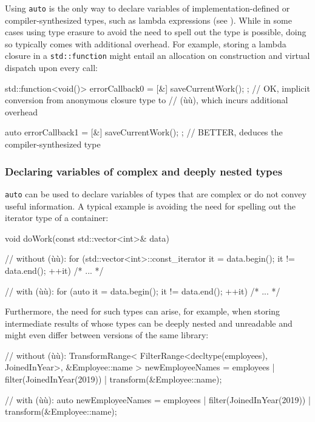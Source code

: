 Using \lstinline!auto! is the only way to declare variables of
implementation-defined or compiler-synthesized types, such as
lambda expressions (see ). While in some cases 
using type erasure to avoid the need to spell out the type is possible, doing so typically
comes with additional overhead. For example, storing a lambda closure in
a \lstinline!std::function! might entail an allocation on construction and
virtual dispatch upon every call:

\begin{emcppslisting}[language=C++]
std::function<void()> errorCallback0 = [&]{ saveCurrentWork(); };
    // OK, implicit conversion from anonymous closure type to
    // (ù{}ù), which incurs additional overhead

auto errorCallback1 = [&]{ saveCurrentWork(); };
    // BETTER, deduces the compiler-synthesized type
\end{emcppslisting}
    

\subsubsection[Declaring variables of complex and deeply nested types]{Declaring variables of complex and deeply nested types}\label{declaring-variables-of-complex-and-deeply-nested-types}

\lstinline!auto! can be used to declare variables of types that are complex
or do not convey useful information. A typical example is avoiding the
need for spelling out the iterator type of a container:

\begin{emcppslisting}[language=C++]
void doWork(const std::vector<int>& data)
{
    // without (ù{}ù):
    for (std::vector<int>::const_iterator it = data.begin();
         it != data.end();
         ++it) {
        /* ... */
    }

    // with (ù{}ù):
    for (auto it = data.begin(); it != data.end(); ++it) { /* ... */ }
}
\end{emcppslisting}
    
\noindent Furthermore, the need for such types can arise, for example, when
storing intermediate results of  whose types can
be deeply nested and unreadable and might even differ between versions of
the same library:

\begin{emcppslisting}[language=C++]
// without (ù{}ù):
TransformRange<
    FilterRange<decltype(employees), JoinedInYear>,
    &Employee::name
> newEmployeeNames =
    employees | filter(JoinedInYear(2019))
              | transform(&Employee::name);

// with (ù{}ù):
auto newEmployeeNames =
    employees | filter(JoinedInYear(2019))
              | transform(&Employee::name);
\end{emcppslisting}
    


